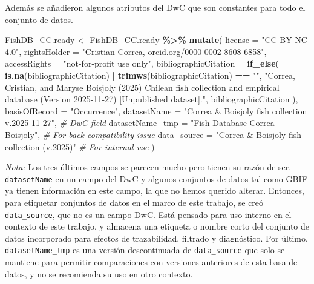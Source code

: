 \documentclass[sn-apa,pdflatex]{sn-jnl}
\newenvironment{Shaded}{\begin{snugshade}}{\end{snugshade}}
\newcommand{\AttributeTok}[1]{\textcolor[rgb]{0.13,0.29,0.53}{#1}}
\newcommand{\CommentTok}[1]{\textcolor[rgb]{0.56,0.35,0.01}{\textit{#1}}}
\newcommand{\FunctionTok}[1]{\textcolor[rgb]{0.13,0.29,0.53}{\textbf{#1}}}
\newcommand{\NormalTok}[1]{#1}
\newcommand{\OtherTok}[1]{\textcolor[rgb]{0.56,0.35,0.01}{#1}}
\newcommand{\SpecialCharTok}[1]{\textcolor[rgb]{0.81,0.36,0.00}{\textbf{#1}}}
\newcommand{\StringTok}[1]{\textcolor[rgb]{0.31,0.60,0.02}{#1}}
\begin{document}
Además se añadieron algunos atributos del DwC que son constantes para
todo el conjunto de datos.

\begin{Shaded}
\begin{Highlighting}[]
\NormalTok{FishDB\_CC.ready }\OtherTok{\textless{}{-}}\NormalTok{ FishDB\_CC.ready }\SpecialCharTok{\%\textgreater{}\%}
  \FunctionTok{mutate}\NormalTok{(}
    \AttributeTok{license =} \StringTok{"CC BY{-}NC 4.0"}\NormalTok{,}
    \AttributeTok{rightsHolder =} \StringTok{"Cristian Correa, orcid.org/0000{-}0002{-}8608{-}6858"}\NormalTok{,}
    \AttributeTok{accessRights =} \StringTok{"not{-}for{-}profit use only"}\NormalTok{,}
    \AttributeTok{bibliographicCitation =} \FunctionTok{if\_else}\NormalTok{(}
      \FunctionTok{is.na}\NormalTok{(bibliographicCitation) }\SpecialCharTok{|} \FunctionTok{trimws}\NormalTok{(bibliographicCitation) }\SpecialCharTok{==} \StringTok{""}\NormalTok{,}
      \StringTok{"Correa, Cristian, and Maryse Boisjoly (2025) Chilean fish collection and empirical database (Version 2025{-}11{-}27) [Unpublished dataset]."}\NormalTok{,}
\NormalTok{      bibliographicCitation}
\NormalTok{    ),}
    \AttributeTok{basisOfRecord =} \StringTok{"Occurrence"}\NormalTok{,}
    \AttributeTok{datasetName =} \StringTok{"Correa \& Boisjoly fish collection v.2025{-}11{-}27"}\NormalTok{, }\CommentTok{\# DwC field }
    \AttributeTok{datasetName\_tmp =} \StringTok{"Fish Database Correa{-}Boisjoly"}\NormalTok{, }\CommentTok{\# For back{-}compatibility issue}
    \AttributeTok{data\_source =} \StringTok{"Correa \& Boisjoly fish collection (v.2025)"} \CommentTok{\#  For internal use  }
\NormalTok{  )}
\end{Highlighting}
\end{Shaded}

\emph{Nota:} Los tres últimos campos se parecen mucho pero tienen su
razón de ser. \texttt{datasetName} en un campo del DwC y algunos
conjuntos de datos tal como GBIF ya tienen información en este campo, la
que no hemos querido alterar. Entonces, para etiquetar conjuntos de
datos en el marco de este trabajo, se creó \texttt{data\_source}, que no
es un campo DwC. Está pensado para uso interno en el contexto de este
trabajo, y almacena una etiqueta o nombre corto del conjunto de datos
incorporado para efectos de trazabilidad, filtrado y diagnóstico. Por
último, \texttt{datasetName\_tmp} es una versión descontinuada de
\texttt{data\_source} que solo se mantiene para permitir comparaciones
con versiones anteriores de esta basa de datos, y no se recomienda su
uso en otro contexto.
\end{document}
